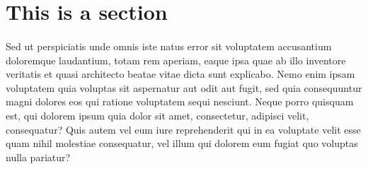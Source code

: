     \section{This is a section}
    \paragraph{}
    Sed ut perspiciatis unde omnis iste natus error sit voluptatem accusantium doloremque laudantium, totam rem aperiam,
    eaque ipsa quae ab illo inventore veritatis et quasi architecto beatae vitae dicta sunt explicabo. Nemo enim ipsam
    voluptatem quia voluptas sit aspernatur aut odit aut fugit, sed quia consequuntur magni dolores eos qui ratione
    voluptatem sequi nesciunt. Neque porro quisquam est, qui dolorem ipsum quia dolor sit amet, consectetur, adipisci
    velit, consequatur? Quis autem vel eum iure reprehenderit qui in ea voluptate velit esse quam nihil molestiae
    consequatur, vel illum qui dolorem eum fugiat quo voluptas nulla pariatur?

    \begin{table}[h!]
        \centering
        \caption{Fisher's Iris data}
        \label{tab:table1}
    \end{table}

\newpage

